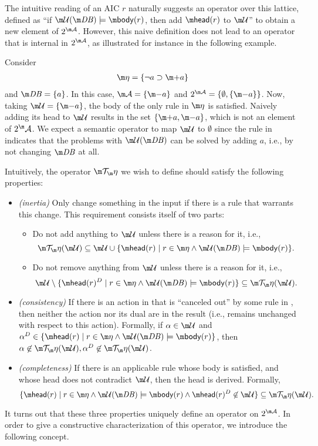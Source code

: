 The intuitive reading of an AIC $r$ naturally suggests an operator over this lattice, defined as ``if $\UU(\db)\models\body(r)$, then add $\head(r)$ to $\UU$'' to obtain a new element of $2^{\acts}$. However, this naive definition does not lead to an operator that is internal in $2^{\acts}$, as illustrated for instance in the following example.
\begin{example}
 Consider 
 \begin{align*}
  \aics = \{ \lnot a \aicrule \add a\} 
 \end{align*}
 and $\db=\{a\}$. 
 In this case, $\acts = \{\remove a\}$ and $2^{\acts} = \{ \emptyset, \{\remove a\}\}$.
 Now, taking $\UU = \{\remove a\}$, the body of the only rule in $\aics$ is satisfied.
 Naively adding its head to $\UU$ results in the set $\{\add a,\remove a\}$, which is not an element of $2^\acts$. 
 We expect a semantic operator to map $\UU$ to $\emptyset$ since the rule in \aics indicates that the problems with $\UU(\db)$ can be solved by adding $a$, i.e., by not changing $\db$ at all. 
\end{example}
Intuitively, the operator $\Op$ we wish to define should satisfy the following properties:
\begin{itemize}
 \item \emph{(inertia)} Only change something in the input if there is a rule that warrants this change. 
 This requirement consists itself of two parts: 
 \begin{itemize}
 \item Do not add anything to $\UU$ unless there is a reason for it, i.e., \[\Op(\UU) \subseteq \UU \cup \{\head(r)\mid r\in \aics \land \UU(\db)\models\body(r)\}.\] 
 \item Do not remove anything from $\UU$ unless there is a reason for it, i.e.,  \[\UU \setminus \{\head(r)^D\mid r\in \aics \land \UU(\db)\models\body(r)\} \subseteq \Op(\UU).\] \end{itemize}
 \item \emph{(consistency)} If there is an action in \UU that is ``canceled out'' by some rule in \aics, then neither the action nor its dual are in the result (i.e., \db remains unchanged with respect to this action). Formally, if $\alpha\in \UU$ and $\alpha^D \in \{\head(r)\mid r\in \aics \land \UU(\db)\models\body(r)\}$, then $\alpha\not \in \Op(\UU), \alpha^D\not \in \Op(\UU)$. 
 \item \emph{(completeness)} If there is an applicable rule whose body is satisfied, and whose head does not contradict $\UU$, then the head is derived. Formally, 
 \[ \{\head(r)\mid r\in \aics \land \UU(\db)\models\body(r) \land \head(r)^D \not \in \UU \}\subseteq \Op(\UU).\]  %
\end{itemize}
It turns out that these three properties uniquely define an operator on $2^{\acts}$. 
In order to give a constructive characterization of this operator, we introduce the following concept. 

